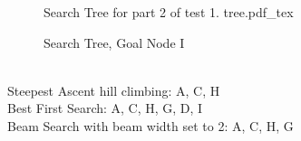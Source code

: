 \documentclass[a4paper]{article}
\newcommand{\incfig}[1]{%
	\def\svgwidth{\columnwidth}
	{#1.pdf_tex}
}
\begin{document}
\begin{figure}[ht]
   Search Tree for part 2 of test 1.
   \centering
   \incfig{tree}
   \caption{Search Tree, Goal Node I}
   \label{fig:tree}
\end{figure}
\\
Steepest Ascent hill climbing: A, C, H\\
Best First Search: A, C, H, G, D, I\\
Beam Search with beam width set to 2: A, C, H, G
\end{document}
